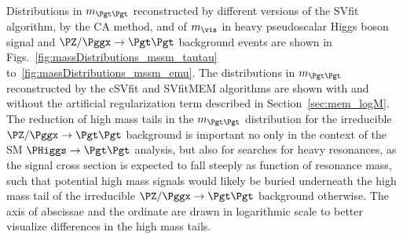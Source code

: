 Distributions in $m_{\Pgt\Pgt}$ reconstructed by different versions of
the SVfit algorithm, by the CA method, and of $m_{\vis}$ in heavy
pseudoscalar Higgs boson signal and $\PZ/\Pggx \to \Pgt\Pgt$
background events are shown in
Figs.~\ref{fig:massDistributions_mssm_tautau}
to~\ref{fig:massDistributions_mssm_emu}.
The distributions in $m_{\Pgt\Pgt}$ reconstructed by the cSVfit and
SVfitMEM algorithms are shown with and without the artificial regularization
term described in Section~\ref{sec:mem_logM}. 
The reduction of high mass tails in the $m_{\Pgt\Pgt}$ distribution
for the irreducible $\PZ/\Pggx \to \Pgt\Pgt$
background is important no only in the context of the SM $\PHiggs \to
\Pgt\Pgt$ analysis, but also for searches for heavy resonances, as the signal cross section is expected to fall steeply as function of resonance mass,
such that potential high mass signals would likely be buried underneath the high mass tail of the irreducible $\PZ/\Pggx \to \Pgt\Pgt$ background otherwise.
The axis of abscissae and the ordinate are drawn in logarithmic scale to better visualize differences in the high mass tails.

